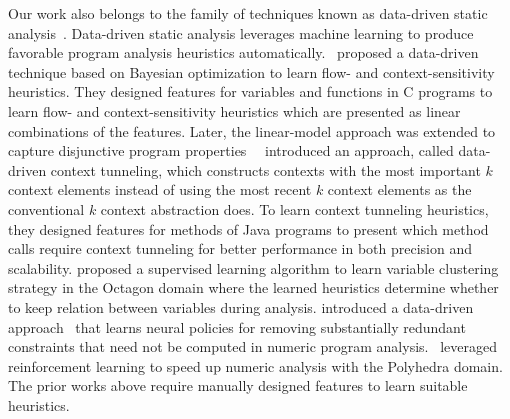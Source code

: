 Our work also belongs to the family of techniques known as data-driven static analysis~\cite{Oh2015, CHA20181,cha2016learning,JeJeChOh17,heo2016unsound,He20pldi}.
Data-driven static analysis leverages machine learning to produce favorable program analysis heuristics automatically.
\citet{Oh2015}~proposed a data-driven technique based on Bayesian optimization to learn flow- and context-sensitivity heuristics.
They designed features for variables and functions in C programs to learn flow- and context-sensitivity heuristics which are presented as linear combinations of the features.
Later, the linear-model approach was extended to capture disjunctive program properties~\cite{JeJeChOh17,10.1145/3293607}
\citet{JeJeOh18}~introduced an approach, called data-driven context tunneling, which constructs contexts with the most important $k$ context elements
instead of using the most recent $k$ context elements as the conventional $k$ context abstraction does.
To learn context tunneling heuristics, they designed features for methods of Java programs to present which method calls require context tunneling for better performance in both precision and scalability.
\citet{Heo2016learning} proposed a supervised learning algorithm to learn variable clustering strategy in the Octagon domain
where the learned heuristics determine whether to keep relation between variables during analysis.
\citet{He20pldi} introduced a data-driven approach \Lait~that learns neural policies for removing substantially redundant constraints that need not be computed in numeric program analysis.
\citet{Singh2018cav}~leveraged reinforcement learning to speed up numeric analysis with the Polyhedra domain.
The prior works above require manually designed features to learn suitable heuristics.
